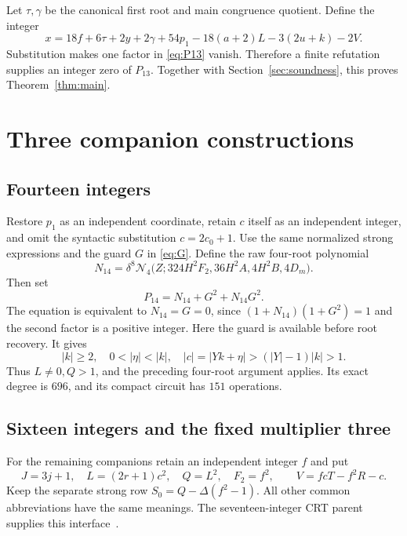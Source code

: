 \documentclass[11pt]{article}
\theoremstyle{definition}
\theoremstyle{remark}
\newcommand{\Norm}{\mathcal N}
\begin{document}
Let \(\tau,\gamma\) be the canonical first root and main congruence
quotient. Define the integer
\begin{equation}
 x=18f+6\tau+2y+2\gamma+54p_1
       -18(a+2)L-3(2u+k)-2V.
 \label{eq:completecarrier}
\end{equation}
Substitution makes one factor in \eqref{eq:P13} vanish. Therefore a finite
refutation supplies an integer zero of \(P_{13}\). Together with
Section~\ref{sec:soundness}, this proves Theorem~\ref{thm:main}.

\section{Three companion constructions}
\label{sec:companions}

\subsection{Fourteen integers}

Restore \(p_1\) as an independent coordinate, retain \(c\) itself as an
independent integer, and omit the syntactic substitution \(c=2c_0+1\).
Use the same normalized strong expressions and the guard \(G\) in
\eqref{eq:G}. Define the raw four-root polynomial
\[
 N_{14}=\delta^8\Norm_4
 \bigl(Z;324H^2F_2,36H^2A,4H^2B,4D_m\bigr).
\]
Then set
\[
 P_{14}=N_{14}+G^2+N_{14}G^2.
\]
The equation is equivalent to \(N_{14}=G=0\), since
\((1+N_{14})(1+G^2)=1\) and the second factor is a positive integer.
Here the guard is available before root recovery. It gives
\[
 |k|\ge2,\quad0<|\eta|<|k|,\quad
 |c|=|Yk+\eta|>(|Y|-1)|k|>1.
\]
Thus \(L\ne0,Q>1\), and the preceding four-root argument applies.
Its exact degree is \(696\), and its compact circuit has \(151\) operations.

\subsection{Sixteen integers and the fixed multiplier three}

For the remaining companions retain an independent integer \(f\) and put
\[
 J=3j+1,\quad L=(2r+1)c^2,\quad Q=L^2,\quad F_2=f^2,
 \qquad V=fcT-f^2R-c.
\]
Keep the separate strong row
\(S_0=Q-\Delta(f^2-1)\).
All other common abbreviations have the same meanings. The
seventeen-integer CRT parent supplies this interface~\cite{incomingpell}.
\end{document}
